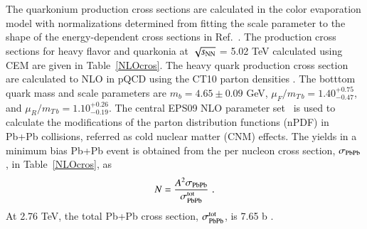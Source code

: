 The quarkonium production cross sections are calculated in the color evaporation model with
normalizations determined from fitting the scale parameter to the shape of the energy-dependent
cross sections in Ref.~\cite{Nelson:2012bc}.
The production cross sections for heavy flavor and quarkonia at $\sqrt{s_{\rm NN}}$ = 5.02 
TeV \cite{Kumar:2012qx} calculated using CEM are given in Table~\ref{NLOcros}.
 The heavy quark production cross section are calculated to NLO in pQCD  
 using the CT10 parton densities \cite{Lai:2010vv}.
 The botttom quark mass and scale parameters are $m_b = 4.65 \pm 0.09$ GeV,
$\mu_F/m_{T\, b} = 1.40^{+0.75}_{-0.47}$, and $\mu_R/m_{T\, b} = 1.10^{+0.26}_{-0.19}$.
The central EPS09 NLO parameter set~\cite{Eskola:2009uj} is used to 
calculate the modifications of the parton distribution functions (nPDF) in 
Pb+Pb collisions, referred as cold nuclear matter (CNM) effects.
The yields in a minimum bias 
Pb+Pb event is obtained from the per nucleon cross
section, $\sigma_{\rm PbPb}$, in Table~\ref{NLOcros}, as
\begin{eqnarray}
N = {A^2 \sigma_{\rm PbPb} \over  
\sigma_{\rm PbPb}^{\rm tot}} \, \, .
\end{eqnarray}
 At 2.76 TeV, the total Pb+Pb cross section, $\sigma_{\rm PbPb}^{\rm tot}$, 
is 7.65 b \cite{Chatrchyan:2011sx}.


%
%




